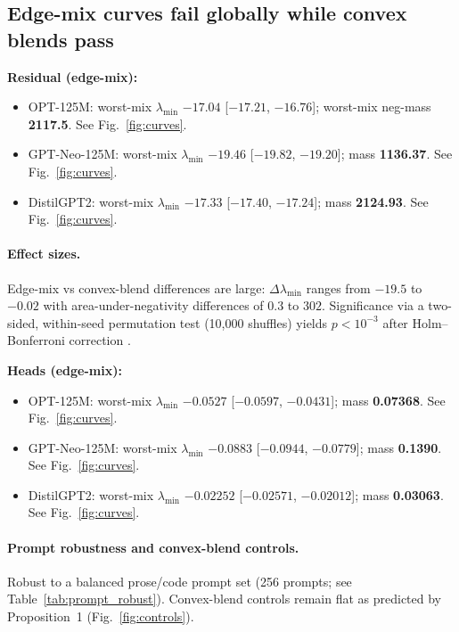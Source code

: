 \documentclass[11pt]{article}
\newcommand{\1}{\mathbf{1}}
\newcommand{\negnum}[1]{\ensuremath{-#1}}
\begin{document}
\subsection{Edge-mix curves fail globally while convex blends pass}
\textbf{Residual (edge-mix):}
\begin{itemize}[leftmargin=1.5em]
\item OPT-125M: worst-mix $\lambda_{\min}$ \textbf{\negnum{17.04}} [\negnum{17.21}, \negnum{16.76}]; worst-mix neg-mass \textbf{2117.5}. See Fig.~\ref{fig:curves}.
\item GPT-Neo-125M: worst-mix $\lambda_{\min}$ \textbf{\negnum{19.46}} [\negnum{19.82}, \negnum{19.20}]; mass \textbf{1136.37}. See Fig.~\ref{fig:curves}.
\item DistilGPT2: worst-mix $\lambda_{\min}$ \textbf{\negnum{17.33}} [\negnum{17.40}, \negnum{17.24}]; mass \textbf{2124.93}. See Fig.~\ref{fig:curves}.
\end{itemize}

\paragraph{Effect sizes.} Edge-mix vs convex-blend differences are large: $\Delta\lambda_{\min}$ ranges from $-19.5$ to $-0.02$ with area-under-negativity differences of $0.3$ to $302$. Significance via a two-sided, within-seed permutation test (10{,}000 shuffles) yields $p<10^{-3}$ after Holm--Bonferroni correction \citep{Holm1979}.

\textbf{Heads (edge-mix):}
\begin{itemize}[leftmargin=1.5em]
\item OPT-125M: worst-mix $\lambda_{\min}$ \textbf{\negnum{0.0527}} [\negnum{0.0597}, \negnum{0.0431}]; mass \textbf{0.07368}. See Fig.~\ref{fig:curves}.
\item GPT-Neo-125M: worst-mix $\lambda_{\min}$ \textbf{\negnum{0.0883}} [\negnum{0.0944}, \negnum{0.0779}]; mass \textbf{0.1390}. See Fig.~\ref{fig:curves}.
\item DistilGPT2: worst-mix $\lambda_{\min}$ \textbf{\negnum{0.02252}} [\negnum{0.02571}, \negnum{0.02012}]; mass \textbf{0.03063}. See Fig.~\ref{fig:curves}.
\end{itemize}

\paragraph{Prompt robustness and convex-blend controls.} Robust to a balanced prose/code prompt set (256 prompts; see Table~\ref{tab:prompt_robust}). Convex-blend controls remain flat as predicted by Proposition~1 (Fig.~\ref{fig:controls}).
\end{document}
